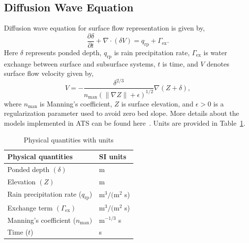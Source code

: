 \documentclass[review,11pt]{elsarticle}
\begin{document}
\subsection{Diffusion Wave Equation}
Diffusion wave equation for surface flow representation is given by,
\begin{equation}\label{diffwaveeq}
\frac{\partial \delta}{\partial t} + \nabla \cdot (\delta V)= q_\text{rp} + \Gamma_\text{ex}.
\end{equation}
Here $\delta$ represents ponded depth, $q_\text{rp}$ is rain precipitation rate, $\Gamma_\text{ex}$ is water exchange between surface and subsurface systems, $t$ is time, and $V$ denotes surface flow velocity given by,
\begin{equation}
V = - \frac{\delta^{2/3}}{n_\text{man} (\| \nabla Z\| +\epsilon)^{1/2}} \nabla(Z + \delta),
\end{equation}
where $n_\text{man}$ is Manning's coefficient, $Z$ is surface elevation, and $\epsilon >0$ is a regularization parameter used to avoid zero bed slope. More details about the models implemented in ATS can be found here~\cite{spainter2016integrated}. Units are provided in Table~\ref{table1}.
\begin{center}
\begin{table}[htbp]
\caption{Physical quantities with units}
\begin{tabular}{| l | l |}
\hline
Physical quantities & SI units \\ \hline
Ponded depth $(\delta)$ & m \\
Elevation $(Z)$ & m \\
Rain precipitation rate ($q_\text{rp}$) & m$^3/($m$^2$ s) \\
Exchange term $(\Gamma_\text{ex})$& m$^3/($m$^2$ s) \\
Manning's coefficient ($n_\text{man}) $ & m$^{-1/3}$ s \\
Time ($t$) & s \\
\hline

\end{tabular}
\label{table1}
\end{table}
\end{center}
\end{document}
